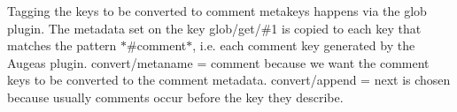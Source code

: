 Tagging the keys to be converted to comment metakeys happens via the glob plugin. The metadata set on the key {\ttfamily glob/get/\#1} is copied to each key that matches the pattern {\ttfamily $\ast$\#comment$\ast$}, i.\+e. each comment key generated by the Augeas plugin. {\ttfamily convert/metaname = comment} because we want the comment keys to be converted to the comment metadata. {\ttfamily convert/append = next} is chosen because usually comments occur before the key they describe. 